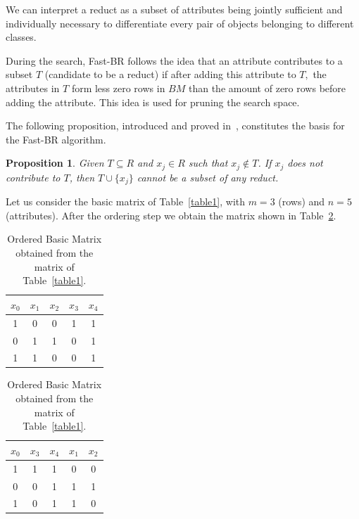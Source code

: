 \documentclass[authoryear,preprint,review,12pt]{elsarticle}
\newtheorem{proposition}{Proposition}
\begin{document}
We can interpret a reduct as a subset of attributes being jointly sufficient and individually necessary to differentiate every pair of objects belonging to different classes.

During the search, Fast-BR follows the idea that an attribute contributes to a subset $T$ (candidate to 
be a reduct) if after adding this attribute to $T,$ the attributes in $T$ form less zero rows 
in $BM$ than the amount of zero rows before adding the attribute. This idea is used for pruning the search
space.

The following proposition, introduced and proved in~\citep{R22}, constitutes the basis for the Fast-BR algorithm.

\begin{proposition}\label{prop1} Given $T \subseteq R$ and $x_j \in R$ such that $x_j \notin T$. If $x_j$ does not contribute to $T$, then $T\cup\{x_j\}$ cannot be a subset of any reduct.
\end{proposition}

Let us consider the basic matrix of Table~\ref{table1}, with $m=3$ (rows) and $n=5$ (attributes). After the
ordering step we obtain the matrix shown in Table~\ref{table2}. 

\begin{table}[!htb]
\begin{minipage}{.5\linewidth}
\caption{Basic Matrix for the example.}\label{table1}
\centering
\begin{tabular}{ ccccc }
\hline
$x_0$ & $x_1$ & $x_2$ & $x_3$ & $x_4$ \\
\hline
1 & 0 & 0 & 1 & 1 \\
0 & 1 & 1 & 0 & 1 \\
1 & 1 & 0 & 0 & 1 \\
\hline
\end{tabular}
\end{minipage}%
\begin{minipage}{.5\linewidth}
\centering
\caption{Ordered Basic Matrix obtained from the matrix of Table~\ref{table1}.}\label{table2}
\begin{tabular}{ ccccc }
\hline
$x_0$ & $x_3$ & $x_4$ & $x_1$ & $x_2$ \\
\hline
1 & 1 & 1 & 0 & 0 \\
0 & 0 & 1 & 1 & 1 \\
1 & 0 & 1 & 1 & 0 \\
\hline
\end{tabular}
\end{minipage}
\end{table}
\end{document}
